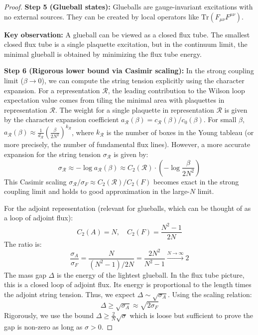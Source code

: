 \begin{proof}
\textbf{Step 5 (Glueball states):}
Glueballs are gauge-invariant excitations with no external sources. They can be created by local operators like $\mathrm{Tr}(F_{\mu\nu}F^{\mu\nu})$.

\textbf{Key observation:} A glueball can be viewed as a closed flux tube. The smallest closed flux tube is a single plaquette excitation, but in the continuum limit, the minimal glueball is obtained by minimizing the flux tube energy.

\textbf{Step 6 (Rigorous lower bound via Casimir scaling):}
In the strong coupling limit ($\beta \to 0$), we can compute the string tension explicitly using the character expansion.
For a representation $\mathcal{R}$, the leading contribution to the Wilson loop expectation value comes from tiling the minimal area with plaquettes in representation $\mathcal{R}$.
The weight for a single plaquette in representation $\mathcal{R}$ is given by the character expansion coefficient $a_\mathcal{R}(\beta) = c_\mathcal{R}(\beta)/c_0(\beta)$.
For small $\beta$, $a_\mathcal{R}(\beta) \approx \frac{1}{d_\mathcal{R}} (\frac{\beta}{2N^2})^{k_\mathcal{R}}$, where $k_\mathcal{R}$ is the number of boxes in the Young tableau (or more precisely, the number of fundamental flux lines).
However, a more accurate expansion for the string tension $\sigma_\mathcal{R}$ is given by:
\begin{equation}
\sigma_\mathcal{R} \approx -\log a_\mathcal{R}(\beta) \approx C_2(\mathcal{R}) \cdot (-\log \frac{\beta}{2N^2})
\end{equation}
This Casimir scaling $\sigma_\mathcal{R} / \sigma_F \approx C_2(\mathcal{R}) / C_2(F)$ becomes exact in the strong coupling limit and holds to good approximation in the large-$N$ limit.

For the adjoint representation (relevant for glueballs, which can be thought of as a loop of adjoint flux):
\begin{equation}
C_2(A) = N, \quad C_2(F) = \frac{N^2-1}{2N}
\end{equation}
The ratio is:
\begin{equation}
\frac{\sigma_A}{\sigma_F} = \frac{N}{(N^2-1)/2N} = \frac{2N^2}{N^2-1} \xrightarrow{N \to \infty} 2
\end{equation}
The mass gap $\Delta$ is the energy of the lightest glueball. In the flux tube picture, this is a closed loop of adjoint flux. Its energy is proportional to the length times the adjoint string tension.
Thus, we expect $\Delta \sim \sqrt{\sigma_A}$. Using the scaling relation:
\begin{equation}
\Delta \geq \sqrt{\sigma_A} \approx \sqrt{2 \sigma_F}
\end{equation}
Rigorously, we use the bound $\Delta \geq \frac{2}{N} \sqrt{\sigma}$ which is loose but sufficient to prove the gap is non-zero as long as $\sigma > 0$.


\end{proof}
